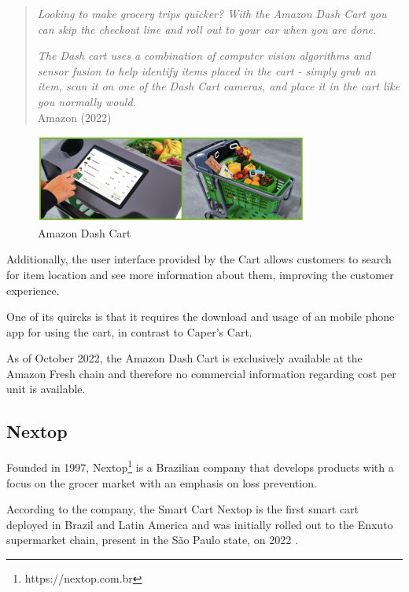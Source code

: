 \documentclass[openright]{normas-utf-tex} %
\begin{document}
\begin{quote}
\textit{Looking to make grocery trips quicker? With the Amazon Dash Cart you can skip the checkout line and roll out to your car when you are done.}

\textit{The Dash cart uses a combination of computer vision algorithms and sensor fusion to help identify items placed in the cart - simply grab an item, scan it on one of the Dash Cart cameras, and place it in the cart like you normally would.}
\\
Amazon (2022)
\end{quote}

\begin{figure}[H]
	\centering
	\includegraphics[width=0.8\textwidth]{./images/dashcart.png}
    \caption[Amazon Dash Cart]{Amazon Dash Cart}
    \label{fig:dashcart}
\end{figure}

Additionally, the user interface provided by the Cart allows customers to search for item location and see more information
about them, improving the customer experience.

One of its quircks is that it requires the download and usage of an mobile phone app for using the cart, in contrast
to Caper's Cart.

As of October 2022, the Amazon Dash Cart is exclusively available at the Amazon
Fresh chain and therefore no commercial information regarding cost per unit is
available.

\subsection{Nextop}

Founded in 1997, Nextop\footnote{https://nextop.com.br} is a Brazilian company
that develops products with a focus on the grocer market with an emphasis on
loss prevention.

According to the company, the Smart Cart Nextop is the first smart cart
deployed in Brazil and Latin America and was initially rolled out to the Enxuto
supermarket chain, present in the São Paulo state, on 2022 \cite{Paraiba2022}.
\end{document}
